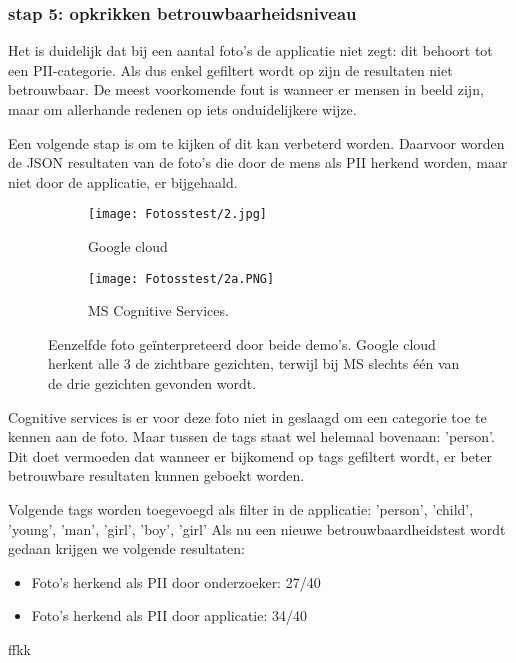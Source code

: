 \subsubsection{stap 5: opkrikken betrouwbaarheidsniveau}
Het is duidelijk dat bij een aantal foto's de applicatie niet zegt: dit behoort tot een PII-categorie. Als dus enkel gefiltert wordt op zijn de resultaten niet betrouwbaar. De meest voorkomende fout is wanneer er mensen in beeld zijn, maar om allerhande redenen op iets onduidelijkere wijze. 

Een volgende stap is om te kijken of dit kan verbeterd worden. Daarvoor worden de JSON resultaten van de foto's die door de mens als PII herkend worden, maar niet door de applicatie, er bijgehaald. 

\begin{figure}[h]
	\centering
	\begin{subfigure}{0.45\textwidth}
		\centering
		\texttt{[image: Fotosstest/2.jpg]}
		\caption{Google cloud}
		\label{fig:qsdfqsdf}
	\end{subfigure}%
	\begin{subfigure}{0.45\textwidth}
		\centering
		\texttt{[image: Fotosstest/2a.PNG]}
		\caption{MS Cognitive Services.}
		\label{fig:sub2}
	\end{subfigure}
	\caption{Eenzelfde foto geïnterpreteerd door beide demo's. Google cloud herkent alle 3 de zichtbare gezichten, terwijl bij MS slechts één van de drie gezichten gevonden wordt.}
	\label{fig:teqsdfqsdfst}
\end{figure}

Cognitive services is er voor deze foto niet in geslaagd om een categorie toe te kennen aan de foto. Maar tussen de tags staat wel helemaal bovenaan: 'person'. Dit doet vermoeden dat wanneer er bijkomend op tags gefiltert wordt, er beter betrouwbare resultaten kunnen geboekt worden. 

Volgende tags worden toegevoegd als filter in de applicatie: 'person', 'child', 'young', 'man', 'girl', 'boy', 'girl'
Als nu een nieuwe betrouwbaardheidstest wordt gedaan krijgen we volgende resultaten: 
\begin{itemize}
	\item Foto's herkend als PII door onderzoeker: 27/40
	\item Foto's herkend als PII door applicatie: 34/40
\end{itemize}
ffkk

